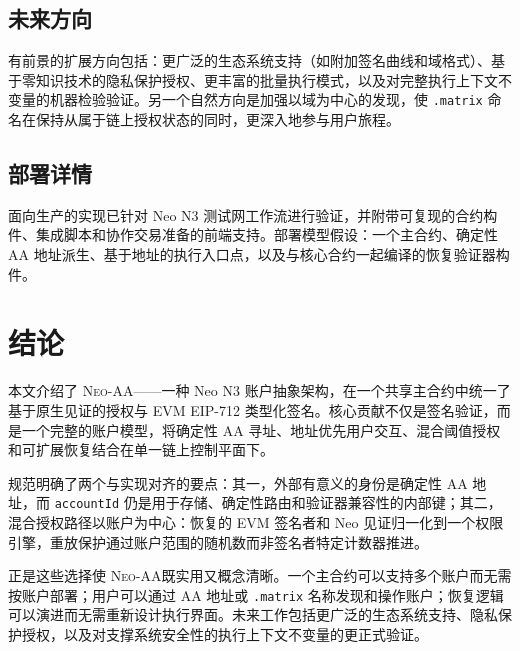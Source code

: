 \documentclass[10pt]{article}
\newcommand{\sys}{\textsc{Neo-AA}}
\newcommand{\code}[1]{\texttt{\small #1}}
\begin{document}
\subsection{未来方向}

有前景的扩展方向包括：更广泛的生态系统支持（如附加签名曲线和域格式）、基于零知识技术的隐私保护授权、更丰富的批量执行模式，以及对完整执行上下文不变量的机器检验验证。另一个自然方向是加强以域为中心的发现，使 \code{.matrix} 命名在保持从属于链上授权状态的同时，更深入地参与用户旅程。

\subsection{部署详情}

面向生产的实现已针对 Neo N3 测试网工作流进行验证，并附带可复现的合约构件、集成脚本和协作交易准备的前端支持。部署模型假设：一个主合约、确定性 AA 地址派生、基于地址的执行入口点，以及与核心合约一起编译的恢复验证器构件。

\section{结论}

本文介绍了 \sys——一种 Neo N3 账户抽象架构，在一个共享主合约中统一了基于原生见证的授权与 EVM EIP-712 类型化签名。核心贡献不仅是签名验证，而是一个完整的账户模型，将确定性 AA 寻址、地址优先用户交互、混合阈值授权和可扩展恢复结合在单一链上控制平面下。

规范明确了两个与实现对齐的要点：其一，外部有意义的身份是确定性 AA 地址，而 \code{accountId} 仍是用于存储、确定性路由和验证器兼容性的内部键；其二，混合授权路径以账户为中心：恢复的 EVM 签名者和 Neo 见证归一化到一个权限引擎，重放保护通过账户范围的随机数而非签名者特定计数器推进。

正是这些选择使 \sys 既实用又概念清晰。一个主合约可以支持多个账户而无需按账户部署；用户可以通过 AA 地址或 \code{.matrix} 名称发现和操作账户；恢复逻辑可以演进而无需重新设计执行界面。未来工作包括更广泛的生态系统支持、隐私保护授权，以及对支撑系统安全性的执行上下文不变量的更正式验证。
\end{document}
